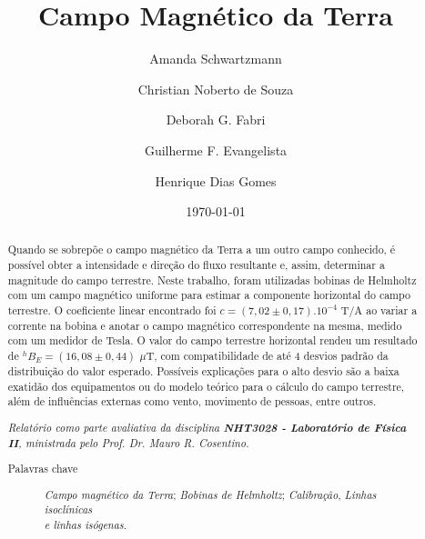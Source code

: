 \documentclass[reprint,amsmath,amssymb,aps]{revtex4-2}
\begin{document}

\title{Campo Magnético da Terra}

\author{Amanda Schwartzmann}
\author{Christian Noberto de Souza}
\author{Deborah G. Fabri}
\author{Guilherme F. Evangelista}
\author{Henrique Dias Gomes}

\date{\today}

\begin{abstract}
Quando se sobrepõe o campo magnético da Terra a um outro campo conhecido, é possível obter a intensidade e direção do fluxo resultante e, assim, determinar a magnitude do campo terrestre. Neste trabalho, foram utilizadas bobinas de Helmholtz com um campo magnético uniforme para estimar a componente horizontal do campo terrestre. O coeficiente linear encontrado foi $c=(7,02 \pm 0,17).10^{-4}$ T/A ao variar a corrente na bobina e anotar o campo magnético correspondente na mesma, medido com um medidor de Tesla. O valor do campo terrestre horizontal rendeu um resultado de $^hB_E=(16,08\pm0,44)$ $\mu$T, com compatibilidade de até 4 desvios padrão da distribuição do valor esperado. Possíveis explicações para o alto desvio são a baixa exatidão dos equipamentos ou do modelo teórico para o cálculo do campo terrestre, além de influências externas como vento, movimento de pessoas, entre outros.

\textit{Relatório como parte avaliativa da disciplina \textbf{NHT3028 - Laboratório de Física II}, ministrada pelo Prof. Dr. Mauro R. Cosentino.}

\begin{description}
\item[Palavras chave]
\textit{Campo magnético da Terra}; \textit{Bobinas de Helmholtz};
\textit{Calibração}, \textit{Linhas isoclínicas\\ e linhas isógenas}.
\end{description}
\end{abstract}

\maketitle

\end{document}
